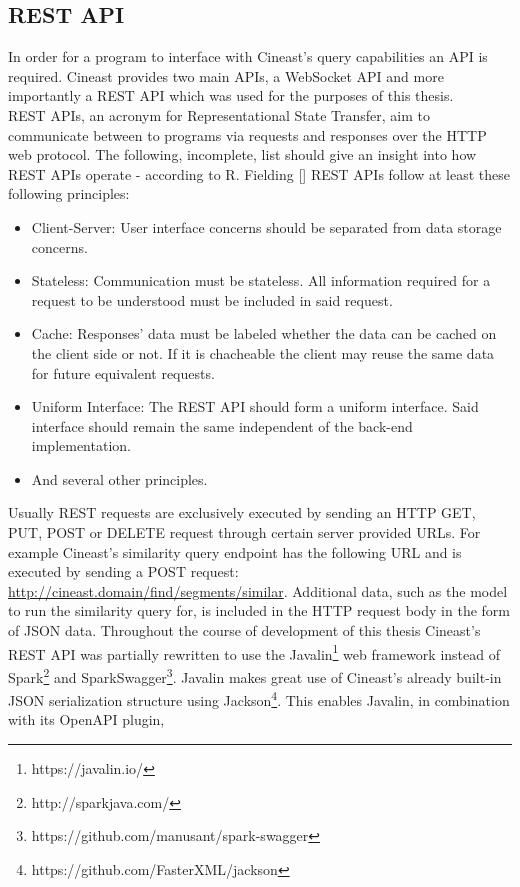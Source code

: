 \subsection{REST API}

In order for a program to interface with Cineast's query capabilities an API is required. Cineast provides two main APIs, a WebSocket API and more importantly a REST API which was
used for the purposes of this thesis.\\
REST APIs, an acronym for Representational State Transfer, aim to communicate between to programs via requests and responses over the HTTP web protocol. The following, incomplete, list should give an insight
into how REST APIs operate - according to R. Fielding [] REST APIs follow at least these following principles:
\begin{itemize}
	\item Client-Server: User interface concerns should be separated from data storage concerns.
	\item Stateless: Communication must be stateless. All information required for a request to be understood must be included in said request.
	\item Cache: Responses' data must be labeled whether the data can be cached on the client side or not. If it is chacheable the client may reuse the same data for future equivalent requests.
	\item Uniform Interface: The REST API should form a uniform interface. Said interface should remain the same independent of the back-end implementation.
	\item And several other principles.
\end{itemize}
Usually REST requests are exclusively executed by sending an HTTP GET, PUT, POST or DELETE request through certain server provided URLs. For example Cineast's similarity query endpoint has the following URL and is executed by
sending a POST request: \url{http://cineast.domain/find/segments/similar}. Additional data, such as the model to run the similarity query for, is included in the HTTP request body in the form of JSON data.
Throughout the course of development of this thesis Cineast's REST API was partially rewritten to use the Javalin\footnote{https://javalin.io/} web framework instead of Spark\footnote{http://sparkjava.com/} and SparkSwagger\footnote{https://github.com/manusant/spark-swagger}. Javalin makes great use of Cineast's already built-in JSON serialization structure using Jackson\footnote{https://github.com/FasterXML/jackson}. This enables Javalin, in combination with its OpenAPI plugin,
